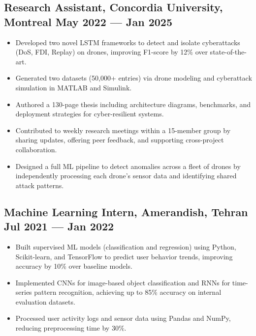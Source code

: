 \documentclass[a4,10pt]{article}
\newcommand{\subtext}[1]{
#1\par\vspace{-0.2cm}}
\newenvironment{zitemize}{
\begin{itemize}\itemsep0pt \parskip0pt \parsep1pt}
{\end{itemize}\vspace{-0.5cm}}
\begin{document}
\subsection*{Research Assistant, {\normalsize\normalfont Concordia University, Montreal} \hfill May 2022 --- Jan 2025} 
    \begin{zitemize}
        \item Developed two novel LSTM frameworks to detect and isolate cyberattacks (DoS, FDI, Replay) on drones, improving F1-score by 12\% over state-of-the-art.
        \item Generated two datasets (50,000+ entries) via drone modeling and cyberattack simulation in MATLAB and Simulink.
        \item Authored a 130-page thesis including architecture diagrams, benchmarks, and deployment strategies for cyber-resilient systems.
        \item Contributed to weekly research meetings within a 15-member group by sharing updates, offering peer feedback, and supporting cross-project collaboration.
        \item Designed a full ML pipeline to detect anomalies across a fleet of drones by independently processing each drone’s sensor data and identifying shared attack patterns.
    \end{zitemize}


\subsection*{Machine Learning Intern, {\normalsize\normalfont Amerandish, Tehran} \hfill Jul 2021 --- Jan 2022} 
    \begin{zitemize}
        \item Built supervised ML models (classification and regression) using Python, Scikit-learn, and TensorFlow to predict user behavior trends, improving accuracy by 10\% over baseline models.
        \item Implemented CNNs for image-based object classification and RNNs for time-series pattern recognition, achieving up to 85\% accuracy on internal evaluation datasets.
        \item Processed user activity logs and sensor data using Pandas and NumPy, reducing preprocessing time by 30\%.
    \end{zitemize}
\end{document}
